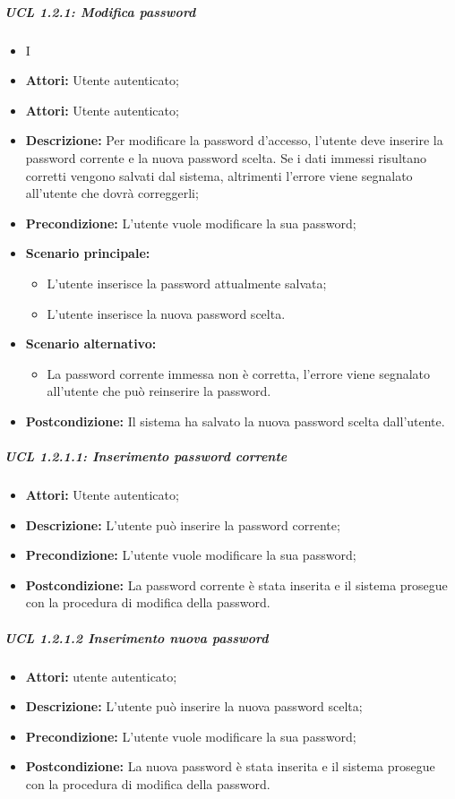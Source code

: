 \subparagraph{UCL 1.2.1: Modifica password}
\begin{itemize}
	\item I\item \textbf{Attori:} Utente autenticato;
	\item \textbf{Attori:} Utente autenticato;
	\item \textbf{Descrizione:} Per modificare la password d'accesso, l'utente deve inserire la password corrente e la nuova password scelta. Se i dati immessi risultano corretti vengono salvati dal sistema, altrimenti l'errore viene segnalato all'utente che dovrà correggerli;
	\item \textbf{Precondizione:} L'utente vuole modificare la sua password;
	\item \textbf{Scenario principale:}
	\begin{itemize}
		\item L'utente inserisce la password attualmente salvata;
		\item L'utente inserisce la nuova password scelta.
	\end{itemize}
	\item \textbf{Scenario alternativo:}
	\begin{itemize}
		\item La password corrente immessa non è corretta, l'errore viene segnalato all'utente che può reinserire la password.
	\end{itemize}
	\item \textbf{Postcondizione:} Il sistema ha salvato la nuova password scelta dall'utente.
\end{itemize}

\subparagraph{UCL 1.2.1.1: Inserimento password corrente}
\begin{itemize}
	\item \textbf{Attori:} Utente autenticato;
	\item \textbf{Descrizione:} L'utente può inserire la password corrente;
	\item \textbf{Precondizione:} L'utente vuole modificare la sua password;
	\item \textbf{Postcondizione:} La password corrente è stata inserita e il sistema prosegue con la procedura di modifica della password.
\end{itemize}

\subparagraph{UCL 1.2.1.2 Inserimento nuova password}
\begin{itemize}
	\item \textbf{Attori: } utente autenticato;
	\item \textbf{Descrizione:} L'utente può inserire la nuova password scelta;
	\item \textbf{Precondizione:} L'utente vuole modificare la sua password;
	\item \textbf{Postcondizione:} La nuova password è stata inserita e il sistema prosegue con la procedura di modifica della password.
\end{itemize}

